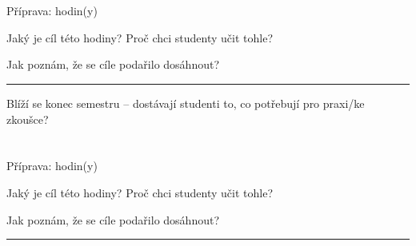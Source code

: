 \commonweek

\commonweek

\commonweek

\commonweek

\chapter{}
\vspace*{-2em}


Příprava:\hspace{1cm} hodin(y)

Jaký je cíl této hodiny? Proč chci studenty učit tohle?
\vspace*{1cm}

Jak poznám, že se cíle podařilo dosáhnout?

\hspace*{-1cm}
\rule{}{0.4pt}


\smileys

\goodbadpoints

Blíží se konec semestru -- dostávají studenti to, co potřebují pro praxi/ke zkoušce?\\

\newpage
{}


\chapter{}
\vspace*{-2em}


Příprava:\hspace{1cm} hodin(y)

Jaký je cíl této hodiny? Proč chci studenty učit tohle?
\vspace*{1cm}

Jak poznám, že se cíle podařilo dosáhnout?

\hspace*{-1cm}
\rule{}{0.4pt}


